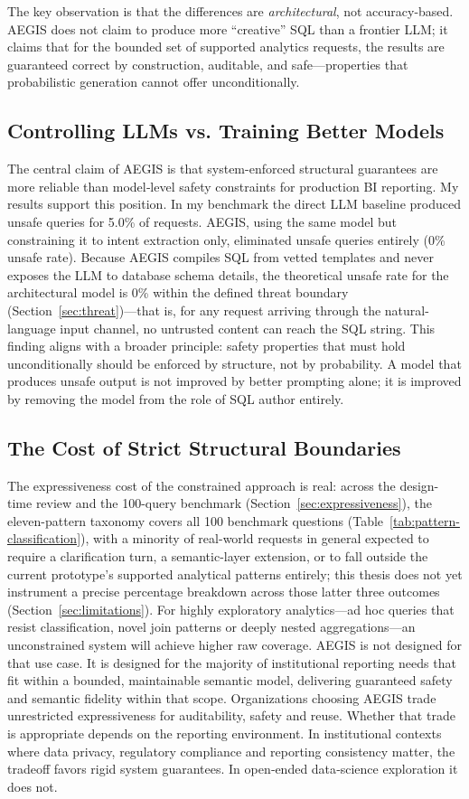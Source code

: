 \documentclass[11pt]{article}
\begin{document}
The key observation is that the differences are \emph{architectural}, not accuracy-based. AEGIS does not claim to produce more ``creative'' SQL than a frontier LLM; it claims that for the bounded set of supported analytics requests, the results are guaranteed correct by construction, auditable, and safe—properties that probabilistic generation cannot offer unconditionally.

\subsection{Controlling LLMs vs. Training Better Models}
The central claim of AEGIS is that system-enforced structural guarantees are more reliable than model‑level safety constraints for production BI reporting. My results support this position. In my benchmark the direct LLM baseline produced unsafe queries for 5.0\% of requests. AEGIS, using the same model but constraining it to intent extraction only, eliminated unsafe queries entirely (0\% unsafe rate). Because AEGIS compiles SQL from vetted templates and never exposes the LLM to database schema details, the theoretical unsafe rate for the architectural model is 0\% within the defined threat boundary (Section~\ref{sec:threat})---that is, for any request arriving through the natural-language input channel, no untrusted content can reach the SQL string. This finding aligns with a broader principle: safety properties that must hold unconditionally should be enforced by structure, not by probability. A model that produces unsafe output is not improved by better prompting alone; it is improved by removing the model from the role of SQL author entirely.

\subsection{The Cost of Strict Structural Boundaries}
The expressiveness cost of the constrained approach is real: across the design-time review and the 100-query benchmark (Section~\ref{sec:expressiveness}), the eleven-pattern taxonomy covers all 100 benchmark questions (Table~\ref{tab:pattern-classification}), with a minority of real-world requests in general expected to require a clarification turn, a semantic-layer extension, or to fall outside the current prototype's supported analytical patterns entirely; this thesis does not yet instrument a precise percentage breakdown across those latter three outcomes (Section~\ref{sec:limitations}). For highly exploratory analytics—ad hoc queries that resist classification, novel join patterns or deeply nested aggregations—an unconstrained system will achieve higher raw coverage. AEGIS is not designed for that use case. It is designed for the majority of institutional reporting needs that fit within a bounded, maintainable semantic model, delivering guaranteed safety and semantic fidelity within that scope. Organizations choosing AEGIS trade unrestricted expressiveness for auditability, safety and reuse. Whether that trade is appropriate depends on the reporting environment. In institutional contexts where data privacy, regulatory compliance and reporting consistency matter, the tradeoff favors rigid system guarantees. In open‑ended data‑science exploration it does not.
\end{document}
